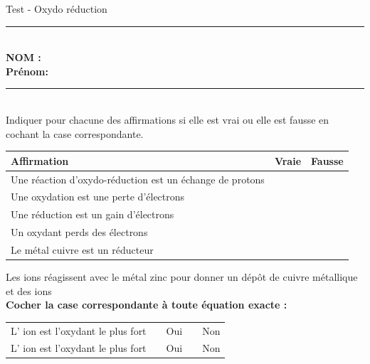 \documentclass[11pt,a4paper]{article}
\renewcommand{\arraystretch}{2}
\newcommand*\acocher{\quitvmode{\fboxsep0pt \fboxrule0.8pt \fbox{\vrule height1.8ex depth.1ex width0pt \vrule height0pt depth0pt width1.9ex }}}
\begin{document}
\center \LARGE{Test - Oxydo réduction\
\\[0,3cm]

\normalsize

\hrule\
\\[0,2cm]

\flushleft \textbf{NOM :\\
Prénom:\\[0,2cm]
}
\hrule\
\\[0,2cm]






 Indiquer pour chacune des affirmations si elle est vrai ou elle est fausse en cochant la case correspondante. \\[0.3cm]

 
\renewcommand{\arraystretch}{1.5}
\begin{center}
\begin{tabularx}{15cm}{|p{11cm}|X|X|}
    \hline
    Affirmation & Vraie & Fausse\\
    \hline
     Une réaction d'oxydo-réduction est un échange de protons & &\\
    \hline
     Une oxydation est une perte d'électrons & &\\
    \hline
    Une réduction est un gain d'électrons & &\\
    \hline
    Un oxydant perds des électrons & &\\
    \hline
    Le métal cuivre est un réducteur &  &\\
    \hline
\end{tabularx}
\end{center}

\vfill
{} Les ions  réagissent avec le métal zinc  pour donner un dépôt  de cuivre métallique \\ et des ions \\[0.5 cm]
\textbf{Cocher la case correspondante à toute équation exacte :} \\[0.5cm]
\begin{center}
\begin{tabularx}{12cm}{p{8cm}X X}
 
   
      L' ion \ch{Cu \pch[2]} est l'oxydant le plus fort  & \acocher ~~Oui & \acocher ~~Non\\
 
     L' ion \ch{Zn \pch[2]} est l'oxydant le plus fort & \acocher ~~Oui & \acocher ~~Non\\
 

\end{tabularx}
\end{center}}
\end{document}
